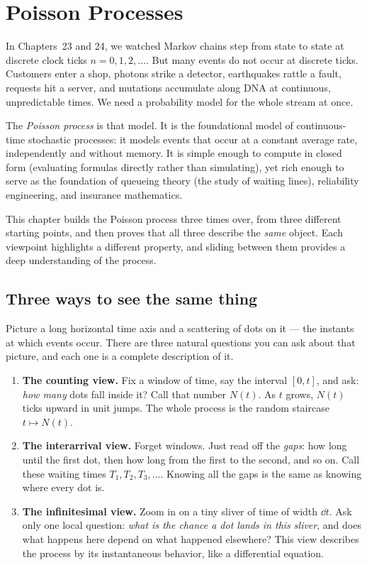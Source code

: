 \chapter{Poisson Processes}

In Chapters~23 and 24, we watched Markov chains step from state to state at discrete
clock ticks $n = 0, 1, 2, \dots$. But many events do not occur at discrete ticks. Customers enter a shop, photons strike a detector, earthquakes rattle a
fault, requests hit a server, and mutations accumulate along DNA at continuous,
unpredictable times. We need a probability model for the whole stream at once.

The \emph{Poisson process} is that model. It is the foundational model of
continuous-time stochastic processes: it models events that occur at a constant average rate,
independently and without memory. It is simple enough to compute in closed form (evaluating formulas directly rather than simulating), yet rich enough to serve as the foundation of queueing theory (the study of waiting lines), reliability engineering, and insurance mathematics.

This chapter builds the Poisson process three times over, from three different
starting points, and then proves that all three describe the \emph{same} object.
Each viewpoint highlights a different property, and sliding between them provides a deep understanding of the process.

\section{Three ways to see the same thing}
\label{ch25:three-views}

Picture a long horizontal time axis and a scattering of dots on it --- the
instants at which events occur. There are three natural questions you can ask
about that picture, and each one is a complete description of it.

\begin{enumerate}
\item \textbf{The counting view.} Fix a window of time, say the interval
$[0,t]$, and ask: \emph{how many} dots fall inside it? Call that number $N(t)$.
As $t$ grows, $N(t)$ ticks upward in unit jumps. The whole process is the random
staircase $t \mapsto N(t)$.
\item \textbf{The interarrival view.} Forget windows. Just read off the
\emph{gaps}: how long until the first dot, then how long from the first to the
second, and so on. Call these waiting times $T_1, T_2, T_3, \dots$. Knowing all
the gaps is the same as knowing where every dot is.
\item \textbf{The infinitesimal view.} Zoom in on a tiny sliver of time of width
$\dd t$. Ask only one local question: \emph{what is the chance a dot lands in
this sliver}, and does what happens here depend on what happened elsewhere? This
view describes the process by its instantaneous behavior, like a differential
equation.
\end{enumerate}


